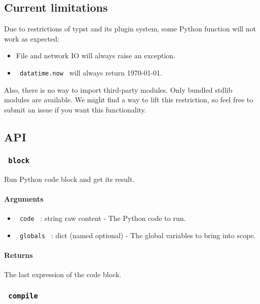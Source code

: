 \subsection{Current limitations}\label{current-limitations}

Due to restrictions of typst and its plugin system, some Python function
will not work as expected:

\begin{itemize}
\tightlist
\item
  File and network IO will always raise an exception.
\item
  \texttt{\ datatime.now\ } will always return 1970-01-01.
\end{itemize}

Also, there is no way to import third-party modules. Only bundled stdlib
modules are available. We might find a way to lift this restriction, so
feel free to submit an issue if you want this functionality.

\subsection{API}\label{api}

\subsubsection{\texorpdfstring{\texttt{\ block\ }}{ block }}\label{block}

Run Python code block and get its result.

\paragraph{Arguments}\label{arguments}

\begin{itemize}
\tightlist
\item
  \texttt{\ code\ } : string \textbar{} raw content - The Python code to
  run.
\item
  \texttt{\ globals\ } : dict (named optional) - The global variables to
  bring into scope.
\end{itemize}

\paragraph{Returns}\label{returns}

The last expression of the code block.

\subsubsection{\texorpdfstring{\texttt{\ compile\ }}{ compile }}\label{compile}

